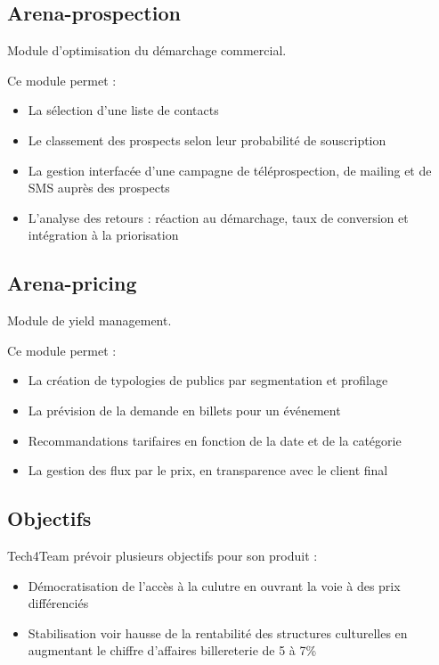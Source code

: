 \subsection{Arena-prospection}
Module d’optimisation du démarchage commercial.

Ce module permet :
\begin{itemize}
  \item[\textbullet] La sélection d’une liste de contacts
  \item[\textbullet] Le classement des prospects selon leur probabilité de souscription
  \item[\textbullet] La gestion interfacée d’une campagne de téléprospection, de mailing et de SMS auprès des prospects
  \item[\textbullet] L'analyse des retours : réaction au démarchage, taux de conversion et intégration à la priorisation
\end{itemize}

\subsection{Arena-pricing}
Module de yield management.

Ce module permet :
\begin{itemize}
  \item[\textbullet] La création de typologies de publics par segmentation et profilage
  \item[\textbullet] La prévision de la demande en billets pour un événement
  \item[\textbullet] Recommandations tarifaires en fonction de la date et de la catégorie
  \item[\textbullet] La gestion des flux par le prix, en transparence avec le client final
\end{itemize}

\subsection{Objectifs}
Tech4Team prévoir plusieurs objectifs pour son produit :
\begin{itemize}
	\item[\textbullet] Démocratisation de l'accès à la culutre en ouvrant la voie à des prix différenciés
	\item[\textbullet] Stabilisation voir hausse de la rentabilité des structures culturelles en augmentant le chiffre d'affaires billereterie de 5 à 7\%
\end{itemize}


